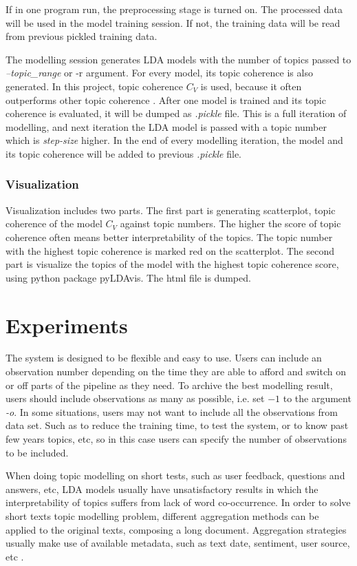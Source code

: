 \documentclass{article} %
\begin{document}
If in one program run, the preprocessing stage is turned on. The processed data will be used in the model training session. If not, the training data
will be read from previous pickled training data.

The modelling session generates LDA models with the number of topics passed to \textit{--topic\_range} or {-r} argument. For every model, its topic coherence is also
generated. In this project, topic coherence $C_V$ is used, because it often outperforms other topic coherence \cite{roder_exploring_2015}. After one model is trained and its topic
coherence is evaluated, it will be dumped as \textit{.pickle} file. This is a full iteration of modelling, and next iteration the LDA model is
passed with a topic number which is \textit{step-size} higher. In the end of every modelling iteration, the model and its topic coherence will be added
to previous \textit{.pickle} file.

\subsubsection{Visualization}
Visualization includes two parts. The first part is generating scatterplot, topic coherence of the model $C_V$ against topic numbers. The higher the score of topic coherence
often means better interpretability of the topics. The topic number with the highest topic coherence is marked red on the scatterplot. The second
part is visualize the topics of the model with the highest topic coherence score, using python package pyLDAvis. The html file is dumped.

\section{Experiments}
The system is designed to be flexible and easy to use. Users can include an observation number depending on the time they are able to afford and switch on or off parts of the pipeline as they need. To archive the best modelling result, users should include observations as many as possible, i.e. set $-1$ to the argument \textit{-o}. In some situations, users may not want to include all the observations from data set. Such as to reduce the training time, to test the system, or to know past few years topics, etc, so in this case users can specify the number of observations to be included.

When doing topic modelling on short tests, such as user feedback, questions and answers, etc, LDA models usually have unsatisfactory results in which the interpretability of topics suffers from lack of word co-occurrence. In order to solve short texts topic modelling problem, different aggregation methods can be applied to the original texts, composing a long document. Aggregation strategies usually make use of available metadata, such as text date, sentiment, user source, etc \cite{weng_twitterrank:_2010, hong_empirical_2010, mehrotra_improving_2013}. 
\end{document}
